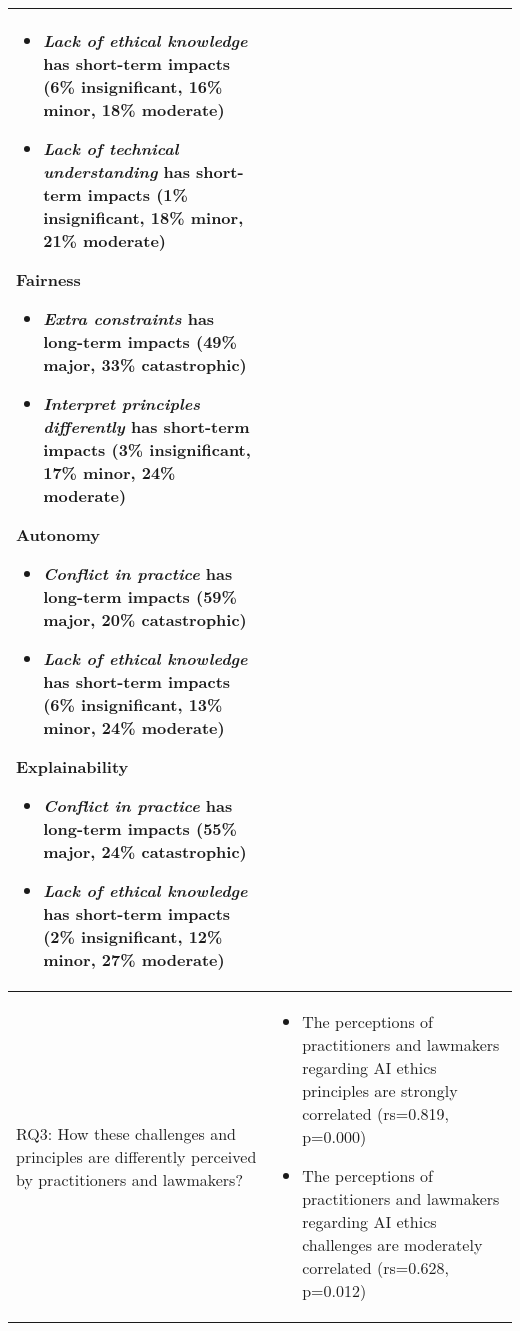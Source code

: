 \begin{table*}
\begin{tabular}{|m{3cm}|m{10cm}|}
\begin{itemize}
    \item \textit{Lack of ethical knowledge} has short-term impacts (6\% insignificant, 16\% minor, 18\% moderate)
    \item \textit{Lack of technical understanding} has short-term impacts (1\% insignificant, 18\% minor, 21\% moderate)
\end{itemize} 
Fairness \vspace{0mm}
\begin{itemize}%
    \item \textit{Extra constraints} has long-term impacts (49\% major, 33\% catastrophic)
    \item \textit{Interpret principles differently} has short-term impacts (3\% insignificant, 17\% minor, 24\% moderate)
\end{itemize} 
Autonomy \vspace{0mm}
\begin{itemize}%
    \item \textit{Conflict in practice} has long-term impacts (59\% major, 20\% catastrophic)
    \item \textit{Lack of ethical knowledge} has short-term impacts (6\% insignificant, 13\% minor, 24\% moderate)
\end{itemize} 
Explainability \vspace{0mm}
\begin{itemize}%
    \item \textit{Conflict in practice } has long-term impacts (55\% major, 24\% catastrophic)
    \item \textit{Lack of ethical knowledge} has short-term impacts (2\% insignificant, 12\% minor, 27\% moderate)
\end{itemize} 
\\
\hline
RQ3: How these challenges and principles are differently perceived by practitioners and lawmakers? &
\begin{itemize}%
    \item The perceptions of practitioners and lawmakers regarding AI ethics principles are strongly correlated (rs=0.819, p=0.000)
    \item The perceptions of practitioners and lawmakers regarding AI ethics challenges are moderately correlated (rs=0.628, p=0.012)
\end{itemize} \\
\hline
\end{tabular}%
\end{table*}


